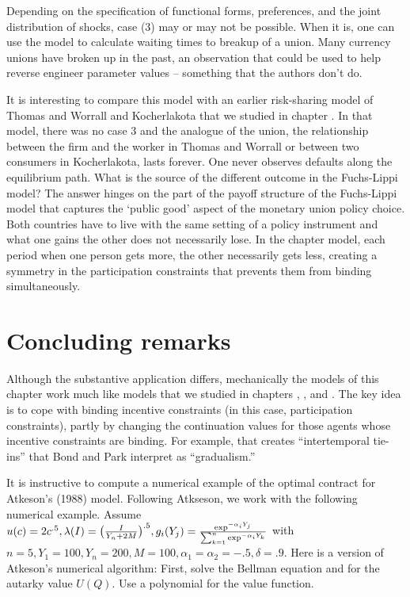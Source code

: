   Depending on the specification of functional forms, preferences, and the joint distribution of shocks, case (3) may or may not be possible.  When it is, one can use the model to calculate waiting times to breakup of a union.  Many currency unions have broken up in the past, an observation
  that could be used to help reverse engineer parameter values -- something that the authors don't do.

  It is interesting to compare this model with an earlier risk-sharing model of Thomas and Worrall  and Kocherlakota that we studied in chapter . In that model, there was no case 3 and the analogue of the union, the relationship between the firm and the worker in Thomas and Worrall or between two consumers in Kocherlakota, lasts forever. One never observes defaults along the equilibrium path.  What is the source of the different  outcome
   in the Fuchs-Lippi model? The answer hinges on the part of the payoff structure of the Fuchs-Lippi model that
  captures the `public good' aspect of the monetary union policy choice. Both countries have to live with the same setting of a policy instrument
  and what one gains the other does not necessarily lose.  In the chapter  model, each period when one person gets more, the other necessarily gets less, creating a symmetry in the participation constraints that prevents them from binding simultaneously.

\section{Concluding remarks}

Although the substantive application differs, mechanically
the models of this chapter work much like models that we studied in
chapters , , and .  The key idea
is to cope with binding incentive constraints (in this case, participation
constraints), partly by changing the continuation values for those
agents whose incentive constraints  are binding.   For example, that creates
``intertemporal tie-ins'' that  Bond and Park
interpret as ``gradualism.''


  It is instructive to compute  a numerical example of the optimal
contract for Atkeson's (1988) model.  Following Atkseson, we work with the
following numerical example.  Assume
$u(c) = 2 c^{.5}, \lambda(I) = \bigl({I \over Y_n + 2M}\bigr)^{.5},
g_i(Y_j)={\exp^{-\alpha_i Y_j} \over \sum_{k=1}^n \exp^{-\alpha_i Y_k}}$
with $n=5, Y_1 =100, Y_n =200, M=100, \alpha_1 = \alpha_2 =-.5, \delta =.9$.
 Here is  a version of  Atkeson's numerical algorithm:
\medskip
{}  First, solve the Bellman equation  and
for the autarky value $U(Q)$.
Use a polynomial for the value function.
\medskip

